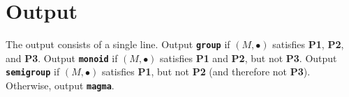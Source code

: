 \section*{Output}

The output consists of a single line. Output \textbf{\texttt{group}} if $(M,\bullet)$
satisfies \textbf{P1}, \textbf{P2}, and \textbf{P3}. Output \textbf{\texttt{monoid}}
if $(M,\bullet)$ satisfies \textbf{P1} and \textbf{P2}, but not \textbf{P3}.
Output \textbf{\texttt{semigroup}} if $(M,\bullet)$ satisfies \textbf{P1}, but not
\textbf{P2} (and therefore not \textbf{P3}). Otherwise, output \textbf{\texttt{magma}}.

